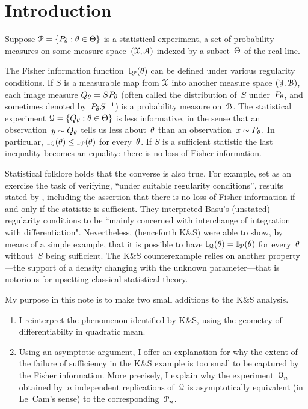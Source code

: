 \documentclass[aos]{imsart}
\theoremstyle{plain}
\theoremstyle{remark}
\begin{document}
%
\section{Introduction}  \label{intro}
Suppose ${\EuScript P}=\{P_\theta: \theta\in\Theta\}$ is a
statistical experiment, a set of probability measures
on some measure space~$({\EuScript X},{\EuScript A})$ indexed by a subset~$\Theta$ of the real line.

The Fisher information function~${\mathbb I}_{\EuScript P}(\theta)$ can be defined under
various regularity conditions.  If $S$ is a measurable map from  ${\EuScript X}$
into another measure space $({\EuScript Y},{\EuScript B})$, each image measure $Q_\theta =
S P_\theta$ (often called the distribution of~$S$ under~$P_\theta$, and sometimes denoted
by~$P_\theta S^{-1}$) is a probability measure on~${\EuScript B}$. The
statistical experiment ${\EuScript Q}=\{Q_\theta:\theta\in\Theta\}$ is  less
informative, in the sense that an observation~$y\sim Q_\theta$ tells us
less about~$\theta$ than an observation~$x\sim P_\theta$.  In particular,
${\mathbb I}_{\EuScript Q}(\theta)\le {\mathbb I}_{\EuScript P}(\theta)$ for every~$\theta$. If $S$ is a sufficient
statistic the last inequality becomes an equality: there is no loss of
Fisher information.

Statistical folklore holds that the converse is also true. For example, \citet[page~158]{LehmannCasella1998}
set as an exercise the task of verifying, ``under suitable regularity conditions'',
results stated by \citet[Section~1]{Basu1964Ancillary}, including the assertion that  there is no loss of Fisher information if and only if the statistic is sufficient. They interpreted Basu's (unstated) regularity conditions to be ``mainly concerned with interchange of integration with differentiation". 
Nevertheless,
\citet{KaganShepp05AmStat} (henceforth K\&S) were able to show, by means of a
simple example, that it is possible to have ${\mathbb I}_{\EuScript Q}(\theta)=
{\mathbb I}_{\EuScript P}(\theta)$ for every~$\theta$ without~$S$ being sufficient. 
The K\&S counterexample relies on another property---the support of a density changing with the unknown parameter---that is notorious for upsetting classical statistical theory.


My purpose in this note is to make two small additions to the K\&S analysis. 
\begin{enumerate}
\item 
I  reinterpret the phenomenon
identified by K\&S, using the geometry of
differentiabilty in quadratic mean.
\item
Using an asymptotic argument,
I  offer an explanation for why the extent of the failure of sufficiency in the K\&S example is too small to be captured by the Fisher information. More precisely, I  explain why the experiment~${\EuScript Q}_n$
obtained by~$n$ independent replications of~${\EuScript Q}$ is asymptotically
equivalent (in Le~Cam's sense) to the corresponding~${\EuScript P}_n$.
\end{enumerate}
\end{document}
